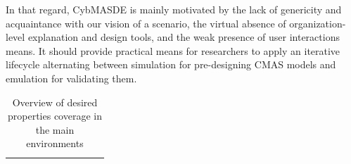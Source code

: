 \documentclass[sigconf]{aamas}
\begin{document}
In that regard, CybMASDE is mainly motivated by the lack of genericity and acquaintance with our vision of a scenario, the virtual absence of organization-level explanation and design tools, and the weak presence of user interactions means. It should provide practical means for researchers to apply an iterative lifecycle alternating between simulation for pre-designing CMAS models and emulation for validating them.

\begin{table}[h]
	\caption{Overview of desired properties coverage in the main environments}
	\label{tab:litterature_review_summary}
	\begin{tabular}{lccccccccc}\toprule

    {}
    & %
    \cite{Hammar2022}
    & %
    \cite{Schwartz2019}
    & %
    \cite{Janisch2023}
    & %
    \cite{Akbari2020}
    & %
    \cite{Drasar2020}
    & %
    \cite{Seifert2021}
    & %
    \cite{Andrew2022}
    & %
    \cite{Hammar2022}
    & %
    \cite{Maxwell2021} \\

    \midrule


\end{tabular}
\end{table}
\end{document}
